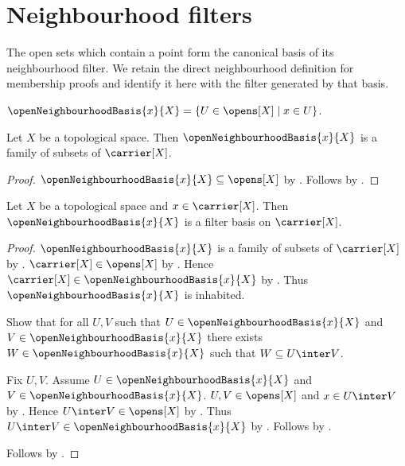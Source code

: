 \section{Neighbourhood filters}




The open sets which contain a point form the canonical basis of its
neighbourhood filter.  We retain the direct neighbourhood definition for
membership proofs and identify it here with the filter generated by that
basis.

\begin{definition}\label{open_neighbourhood_basis}
    $\openNeighbourhoodBasis{x}{X}
        =\{U\in\opens[X]\mid x\in U\}$.
\end{definition}

\begin{proposition}\label{open_neighbourhood_basis_type}
    Let $X$ be a topological space.
    Then $\openNeighbourhoodBasis{x}{X}$ is a family of subsets of
        $\carrier[X]$.
\end{proposition}
\begin{proof}
    $\openNeighbourhoodBasis{x}{X}\subseteq\opens[X]$ by
        .
    Follows by .
\end{proof}

\begin{theorem}\label{open_neighbourhood_basis_is_filter_basis}
    Let $X$ be a topological space and $x\in\carrier[X]$.
    Then $\openNeighbourhoodBasis{x}{X}$ is a filter basis on
        $\carrier[X]$.
\end{theorem}
\begin{proof}
    $\openNeighbourhoodBasis{x}{X}$ is a family of subsets of
        $\carrier[X]$ by .
    $\carrier[X]\in\opens[X]$ by .
    Hence $\carrier[X]\in\openNeighbourhoodBasis{x}{X}$ by
        .
    Thus $\openNeighbourhoodBasis{x}{X}$ is inhabited.

    Show that for all $U,V$ such that
        $U\in\openNeighbourhoodBasis{x}{X}$ and
        $V\in\openNeighbourhoodBasis{x}{X}$
        there exists $W\in\openNeighbourhoodBasis{x}{X}$ such that
        $W\subseteq U\inter V$.
    \begin{subproof}
        Fix $U,V$.
        Assume $U\in\openNeighbourhoodBasis{x}{X}$ and
            $V\in\openNeighbourhoodBasis{x}{X}$.
        $U,V\in\opens[X]$ and $x\in U\inter V$ by
            .
        Hence $U\inter V\in\opens[X]$ by .
        Thus $U\inter V\in\openNeighbourhoodBasis{x}{X}$ by
            .
        Follows by .
    \end{subproof}
    Follows by .
\end{proof}

